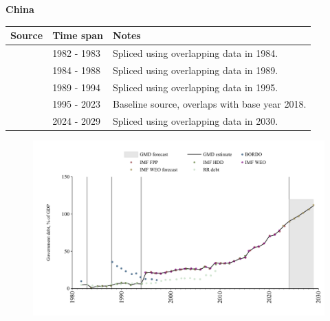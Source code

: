 \documentclass[12pt,a4paper,landscape]{article}
\begin{document}
\begin{adjustbox}{max totalsize={\paperwidth}{\paperheight},center}
\begin{minipage}[t][\textheight][t]{\textwidth}
\vspace*{0.5cm}
{}
\begin{center}
{\Large\bfseries China}
\end{center}
\vspace{0.5cm}
\begin{table}[H]
\centering
\small
\begin{tabular}{|l|l|l|}
\hline
\textbf{Source} & \textbf{Time span} & \textbf{Notes} \\
\hline
\rowcolor{white}\cite{RR_debt}& 1982 - 1983 &Spliced using overlapping data in 1984.\\
\rowcolor{lightgray}\cite{IMF_FPP}& 1984 - 1988 &Spliced using overlapping data in 1989.\\
\rowcolor{white}\cite{IMF_HDD}& 1989 - 1994 &Spliced using overlapping data in 1995.\\
\rowcolor{lightgray}\cite{IMF_FPP}& 1995 - 2023 &Baseline source, overlaps with base year 2018.\\
\rowcolor{white}\cite{IMF_WEO_forecast}& 2024 - 2029 &Spliced using overlapping data in 2030.\\
\hline
\end{tabular}
\end{table}
\begin{figure}[H]
\centering
\includegraphics[width=\textwidth,height=0.6\textheight,keepaspectratio]{graphs/CHN_govdebt_GDP.pdf}
\end{figure}
\end{minipage}
\end{adjustbox}
\end{document}

